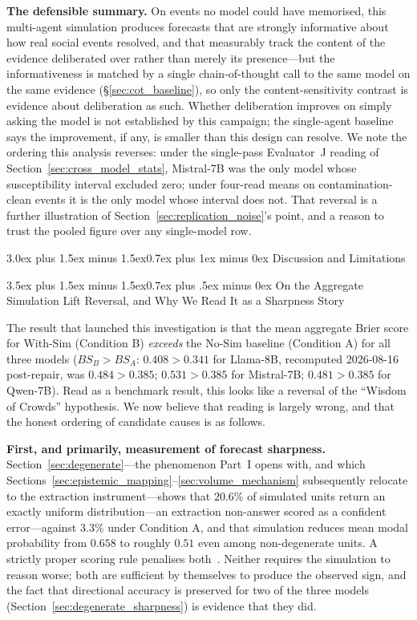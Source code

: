 \documentclass[11pt,journal,onecolumn]{IEEEtran}
\makeatletter
\renewcommand\section{\@startsection{section}{1}{\z@}%
  {3.0ex plus 1.5ex minus 1.5ex}{0.7ex plus 1ex minus 0ex}%
  {\normalfont\normalsize\centering\bfseries}}
\renewcommand\subsection{\@startsection{subsection}{2}{\z@}%
  {3.5ex plus 1.5ex minus 1.5ex}{0.7ex plus .5ex minus 0ex}%
  {\normalfont\normalsize\bfseries}}
\makeatother
\begin{document}
\textbf{The defensible summary.} On events no model could have memorised, this multi-agent simulation produces forecasts that are strongly informative about how real social events resolved, and that measurably track the content of the evidence deliberated over rather than merely its presence---but the informativeness is matched by a single chain-of-thought call to the same model on the same evidence (\S\ref{sec:cot_baseline}), so only the content-sensitivity contrast is evidence about deliberation as such. Whether deliberation improves on simply asking the model is not established by this campaign; the single-agent baseline says the improvement, if any, is smaller than this design can resolve. We note the ordering this analysis reverses: under the single-pass Evaluator~J reading of Section~\ref{sec:cross_model_stats}, Mistral-7B was the only model whose susceptibility interval excluded zero; under four-read means on contamination-clean events it is the only model whose interval does not. That reversal is a further illustration of Section~\ref{sec:replication_noise}'s point, and a reason to trust the pooled figure over any single-model row.


\section{Discussion and Limitations}
\label{sec:discussion}

\subsection{On the Aggregate Simulation Lift Reversal, and Why We Read It as a Sharpness Story}
\label{sec:lift_reversal}

The result that launched this investigation is that the mean aggregate Brier score for With-Sim (Condition B) \emph{exceeds} the No-Sim baseline (Condition A) for all three models ($BS_B > BS_A$: $0.408 > 0.341$ for Llama-8B, recomputed 2026-08-16 post-repair, was $0.484 > 0.385$; $0.531 > 0.385$ for Mistral-7B; $0.481 > 0.385$ for Qwen-7B). Read as a benchmark result, this looks like a reversal of the ``Wisdom of Crowds'' hypothesis. We now believe that reading is largely wrong, and that the honest ordering of candidate causes is as follows.

\textbf{First, and primarily, measurement of forecast sharpness.} Section~\ref{sec:degenerate}---the phenomenon Part~I opens with, and which Sections~\ref{sec:epistemic_mapping}--\ref{sec:volume_mechanism} subsequently relocate to the extraction instrument---shows that $20.6\%$ of simulated units return an exactly uniform distribution---an extraction non-answer scored as a confident error---against $3.3\%$ under Condition A, and that simulation reduces mean modal probability from $0.658$ to roughly $0.51$ even among non-degenerate units. A strictly proper scoring rule penalises both~\cite{gneiting2007}. Neither requires the simulation to reason worse; both are sufficient by themselves to produce the observed sign, and the fact that directional accuracy is preserved for two of the three models (Section~\ref{sec:degenerate_sharpness}) is evidence that they did.
\end{document}
